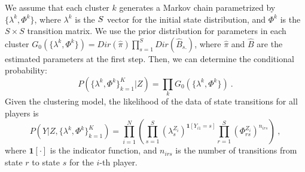 We assume that each cluster $k$ generates a Markov chain parametrized by $\{\lambda^k, \Phi^k\}$, 
where $\lambda^k$ is the $S\time 1$ vector for the initial state distribution, 
and $\Phi^k$ is the $S \times S$ transition matrix. We use the prior distribution 
for parameters in each cluster $G_0(\{\lambda^k, \Phi^k\}) = Dir(\hat\pi) \prod_{s=1}^S Dir (\hat B_{s.})$,
where $\hat\pi$ and $\hat B$ are the estimated parameters at the first step. 
Then, we can determine the conditional probability:  
\begin{equation}
\label{eq:condi}
  P(\{\lambda^k, \Phi^k \}_{k=1}^K | Z ) 
= \prod_k G_0(\{\lambda^k, \Phi^k\})~.
\end{equation}
Given the clustering model, the likelihood of the data of state transitions for all players is
\begin{equation}
\label{eq:likeli}
  P(Y| Z, \{\lambda^k, \Phi^k \}_{k=1}^K) 
= \prod_{i=1}^N \left( \prod_{s=1}^S (\lambda_s^{Z_i})^{\mathbf{1}[Y_{i1} = s]} \prod_{r=1}^S \left(\Phi_{rs}^{Z_i}\right)^{n_{irs}} \right)~,
\end{equation}
where $\mathbf{1} [\cdot]$ is the indicator function, and $n_{irs}$ is the number of transitions from state $r$ to state $s$ for the $i$-th player.

